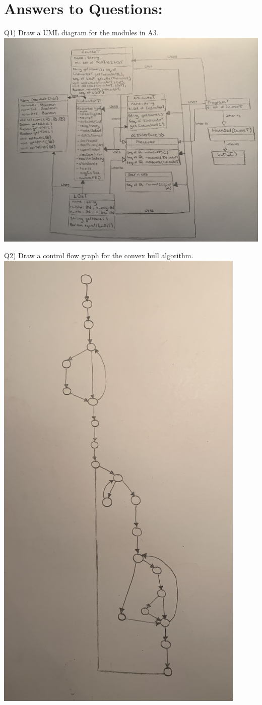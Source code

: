 \documentclass{article}
\begin{document}
\section*{Answers to Questions:}

Q1) Draw a UML diagram for the modules in A3.
\\
\includegraphics[width=\textwidth,height=\textheight,keepaspectratio]{2me3_A4_Q1.JPG}

\newpage
Q2) Draw a control flow graph for the convex hull algorithm. \\
\includegraphics[width=0.9\textwidth,height=0.9\textheight,keepaspectratio]{2me3_A4_Q2.JPG}
\end{document}
